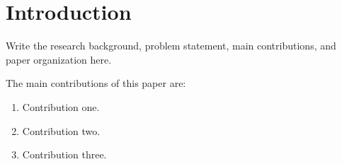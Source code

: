 \section{Introduction}

Write the research background, problem statement, main contributions, and paper
organization here.

The main contributions of this paper are:
\begin{enumerate}
  \item Contribution one.
  \item Contribution two.
  \item Contribution three.
\end{enumerate}
